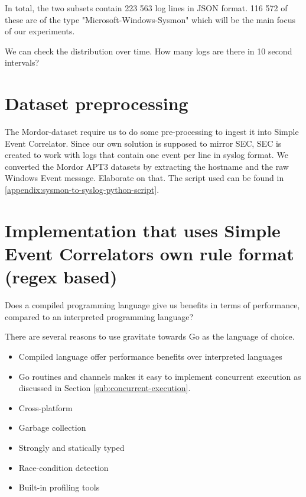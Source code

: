 In total, the two subsets contain 223 563 log lines in JSON format. 116 572 of these are of the type "Microsoft-Windows-Sysmon" which will be the main focus of our experiments.

We can check the distribution over time. How many logs are there in 10 second intervals?

\section{Dataset preprocessing}
\label{sec:datasetprocessing}

The Mordor-dataset require us to do some pre-processing to ingest it into Simple Event Correlator. Since our own solution is supposed to mirror SEC, 
SEC is created to work with logs that contain one event per line in syslog format. We converted the Mordor APT3 datasets by extracting the hostname and the raw Windows Event message. Elaborate on that. The script used can be found in \cref{appendix:sysmon-to-syslog-python-script}.

\iffalse
cat empire_apt3_2019-05-14223117.json | grep -i "Microsoft-Windows-Sysmon" | jq -c '. | {message: .message, hostname: .winlog.computer_name }' > ~/master-files/eventlogs/mordor/sysmon-empire.json

\fi

\section{Implementation that uses Simple Event Correlators own rule format (regex based)}

Does a compiled programming language give us benefits in terms of performance, compared to an interpreted programming language?


There are several reasons to use gravitate towards Go as the language of choice.
\begin{itemize}
    \item Compiled language offer performance benefits over interpreted languages
    \item Go routines and channels makes it easy to implement concurrent execution as discussed in Section \cref{sub:concurrent-execution}.
    \item Cross-platform
    \item Garbage collection
    \item Strongly and statically typed
    \item Race-condition detection
    \item Built-in profiling tools
\end{itemize}

